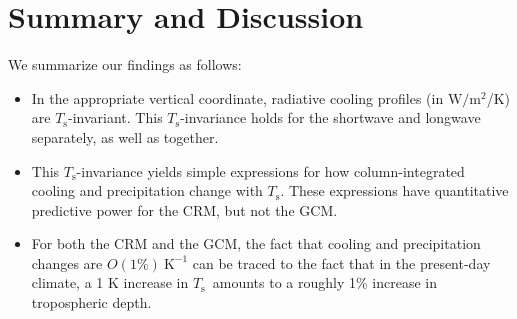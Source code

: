 \documentclass[10pt]{article}
\newcommand{\beqn}{\begin{equation}}
\newcommand{\eeqn}{\end{equation}}
\newcommand{\eqnref}[1]{(\ref{#1})}
\newcommand{\ppt}{\ensuremath{\partial_T}}
\newcommand{\Fnetgl}{\ensuremath{F^\mathrm{net}_{\mathrm{gl}}}}
\newcommand{\Wmsq}{\ensuremath{\mathrm{W/m^2}}}
\newcommand{\Ts}{\ensuremath{T_\mathrm{s}}}
\newcommand{\Tsgl}{\ensuremath{T_\mathrm{s,gl}}}
\newcommand{\Ttp}{\ensuremath{T_\mathrm{tp}}}
\newcommand{\Kinverse}{\ensuremath{\mathrm{K^{-1}}}}
\begin{document}
%

\section{Summary and Discussion}
We summarize our findings as follows:
	\begin{itemize}
		\item In the appropriate vertical coordinate,  radiative cooling profiles (in \Wmsq /K) are  \Ts-invariant. This \Ts-invariance holds for the shortwave and longwave separately, as well as together.
		\item This \Ts-invariance yields simple expressions for how  column-integrated cooling and  precipitation  change with \Ts. These expressions have quantitative predictive power for the CRM, but not the GCM.
		\item For both the CRM and the GCM, the fact that cooling and precipitation changes are $O(1\%)\ \Kinverse$ can be traced to the fact that in the present-day climate, a 1 K increase in \Ts\ amounts to a roughly 1\% increase in tropospheric depth. 	\end{itemize}
		
\end{document}
